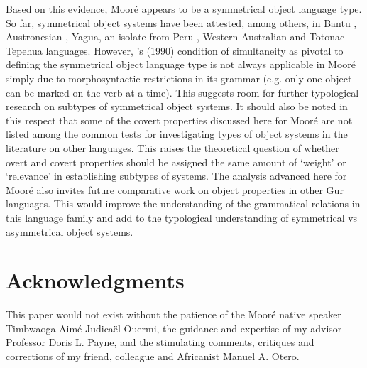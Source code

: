\documentclass[output=paper]{langsci/langscibook}
\begin{document}
Based on this evidence, Mooré appears to be a symmetrical object language type. So far, symmetrical object systems have been attested, among others, in Bantu \citep{BresnanMoshi1990}, Austronesian \citep{donohue1996}, Yagua, an isolate from Peru \citep{paynepayne1989}, Western Australian \citep{dench1995} and Totonac-Tepehua \citep{mckaytrechsel2008} languages. However, \citeauthor{bresnanmoshi1990}'s (1990)  condition of simultaneity as pivotal to defining the symmetrical object language type is not always applicable in Mooré simply due to morphosyntactic restrictions in its grammar (e.g. only one object can be marked on the verb at a time). This suggests room for further typological research on subtypes of symmetrical object systems. It should also be noted in this respect that some of the covert properties discussed here for Mooré are not listed among the common tests for investigating types of object systems in the literature on other languages. This raises the theoretical question of whether overt and covert properties should be assigned the same amount of `weight' or `relevance' in establishing subtypes of systems. The analysis advanced here for Mooré also invites future comparative work on object properties in other Gur languages. This would improve the understanding of the grammatical relations in this language family and add to the typological understanding of symmetrical vs asymmetrical object systems.

\section*{Acknowledgments}

This paper would not exist without the patience of the Mooré native speaker Timbwaoga Aimé Judicaël Ouermi, the guidance and expertise of my advisor Professor Doris L. Payne, and the stimulating comments, critiques and corrections of my friend, colleague and Africanist Manuel A. Otero. 
\end{document}
